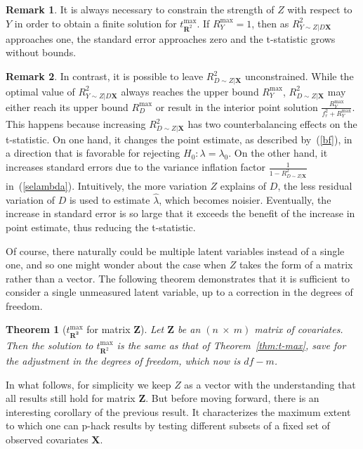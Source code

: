 \documentclass[sts]{imsart}
\theoremstyle{plain}
\newtheorem{theorem}{Theorem}
\theoremstyle{definition}
\newtheorem{remark}{Remark}
\newcommand{\df}{df}
\newcommand{\tmax}{t_{\boldsymbol{R}^2}^{\max}}
\newcommand{\Ry}{R^2_{Y\sim Z | D\mathbf{X}}}
\newcommand{\Rd}{R^2_{D\sim Z | \mathbf{X}}}
\newcommand{\Rymax}{R^{\max }_{Y}}
\newcommand{\Rdmax}{R^{\max }_{D}}
\begin{document}
\begin{remark} 
\label{rmk:r2y}
It is always necessary to constrain the strength of $Z$ with respect to $Y$ in order to obtain a finite solution for $\tmax$. If $\Rymax = 1$, then as $\Ry$ approaches one, the standard error approaches zero and the t-statistic grows without bounds. 
\end{remark}

\begin{remark}
\label{rmk:r2d}
In contrast,  it is possible to leave $\Rd$ unconstrained. While the optimal value of $\Ry$ always reaches the upper bound $\Rymax$, $\Rd$ may either reach its upper bound $\Rdmax$ or result in the interior point solution $\frac{\Rymax}{f_{r} ^2 + \Rymax}$.   This happens because increasing $\Rd$ has two counterbalancing effects on the t-statistic. On one hand, it changes the point estimate, as described by~(\ref{bf}), in a direction that is favorable for rejecting $H_0:\lambda = \lambda_0$.  On the other hand, it increases standard errors due to the variance inflation factor $\frac{1}{1-\Rd}$ in~(\ref{selambda}).  Intuitively, the more variation $Z$ explains of $D$, the less residual variation of $D$ is used to estimate $\hat{\lambda}$, which becomes noisier. Eventually, the increase in standard error is so large that it exceeds the benefit of the increase in point estimate, thus reducing the t-statistic. 
\end{remark}

Of course, there naturally could be multiple latent variables instead of a single one, and so one might wonder about the case when $Z$ takes the form of a matrix rather than a vector. The following theorem demonstrates that it is sufficient to consider a single unmeasured latent variable, up to a correction in the degrees of freedom.

\begin{theorem}[$t_{\boldsymbol{R^2}}^{\max}$ for matrix $\mathbf{Z}$]
\label{thm:multi-tmax}
Let $\mathbf{Z}$ be an $(n~\times~m)$ matrix of covariates. Then the solution to $\tmax$ is the same as that of Theorem~\ref{thm:t-max}, save for the adjustment in the degrees of freedom, which now is $\df-m$. 
\end{theorem}

In what follows, for simplicity we keep $Z$ as a vector with the understanding that all results still hold for matrix $\mathbf{Z}$. 
But before moving forward, there is an interesting corollary of the previous result. 
It characterizes the maximum extent to which one can p-hack results by testing different subsets of a fixed set of observed covariates $\mathbf{X}$.
\end{document}
